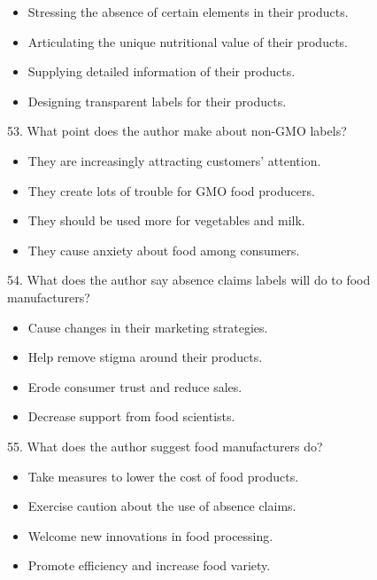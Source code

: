 \documentclass[UTF8,11pt]{ctexart}
\begin{document}
\begin{itemize}[leftmargin=2em,itemsep=.2em,topsep=.4em]\item[A.] Stressing the absence of certain elements in their products.
\item[B.] Articulating the unique nutritional value of their products.
\item[C.] Supplying detailed information of their products.
\item[D.] Designing transparent labels for their products.
\end{itemize}

53. What point does the author make about non-GMO labels?


\begin{itemize}[leftmargin=2em,itemsep=.2em,topsep=.4em]\item[A.] They are increasingly attracting customers' attention.
\item[B.] They create lots of trouble for GMO food producers.
\end{itemize}

\begin{itemize}[leftmargin=2em,itemsep=.2em,topsep=.4em]\item[C.] They should be used more for vegetables and milk.
\item[D.] They cause anxiety about food among consumers.
\end{itemize}

54. What does the author say absence claims labels will do to food manufacturers?


\begin{itemize}[leftmargin=2em,itemsep=.2em,topsep=.4em]\item[A.] Cause changes in their marketing strategies.
\item[B.] Help remove stigma around their products.
\item[C.] Erode consumer trust and reduce sales.
\item[D.] Decrease support from food scientists.
\end{itemize}

55. What does the author suggest food manufacturers do?


\begin{itemize}[leftmargin=2em,itemsep=.2em,topsep=.4em]\item[A.] Take measures to lower the cost of food products.
\item[B.] Exercise caution about the use of absence claims.
\item[C.] Welcome new innovations in food processing.
\item[D.] Promote efficiency and increase food variety.
\end{itemize}
\end{document}
